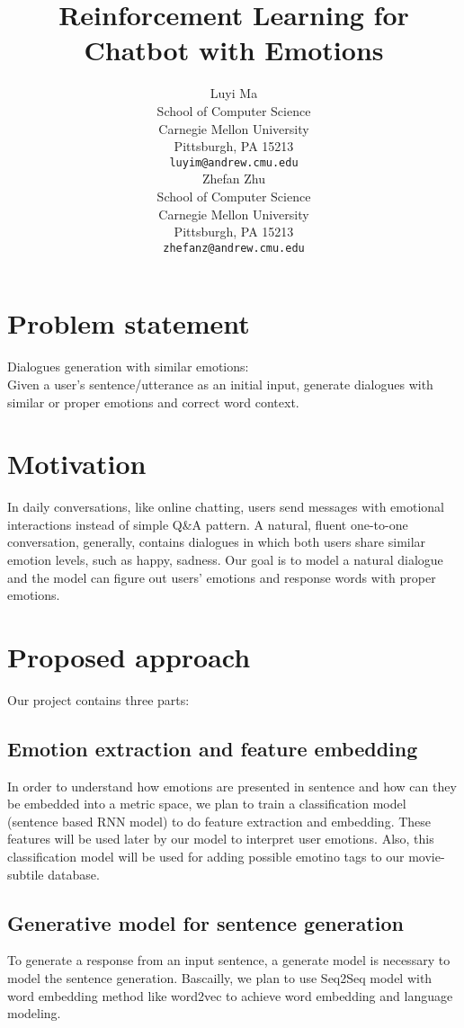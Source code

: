 \documentclass{article}
\title{Reinforcement Learning for Chatbot with Emotions}
\author{
  Luyi Ma \\
  School of Computer Science\\
  Carnegie Mellon University\\
  Pittsburgh, PA 15213 \\
  \texttt{luyim@andrew.cmu.edu} \\
  \And
  Zhefan Zhu \\
  School of Computer Science \\
  Carnegie Mellon University\\
  Pittsburgh, PA 15213 \\
  \texttt{zhefanz@andrew.cmu.edu} \\  
}
\begin{document}

\maketitle



\section{Problem statement}
Dialogues generation with similar emotions: \\
Given a user's sentence/utterance as an initial input, generate dialogues with similar or proper emotions and correct word context.



\section{Motivation}
In daily conversations, like online chatting, users send messages with emotional interactions instead of simple Q\&A pattern. A natural, fluent one-to-one conversation, generally, contains dialogues in which both users share similar emotion levels, such as happy, sadness. Our goal is to model a natural dialogue and the model can figure out users' emotions and response words with proper emotions.




\section{Proposed approach}
Our project contains three parts:


\subsection{Emotion extraction and feature embedding}
In order to understand how emotions are presented in sentence and how can they be embedded into a metric space, we plan to train a classification model (sentence based RNN model) to do feature extraction and embedding. These features will be used later by our model to interpret user emotions. Also, this classification model will be used for adding possible emotino tags to our movie-subtile database. \par



\subsection{Generative model for sentence generation}
To generate a response from an input sentence, a generate model is necessary to model the sentence generation. Bascailly, we plan to use Seq2Seq model with word embedding method like word2vec to achieve word embedding and language modeling.
\end{document}
